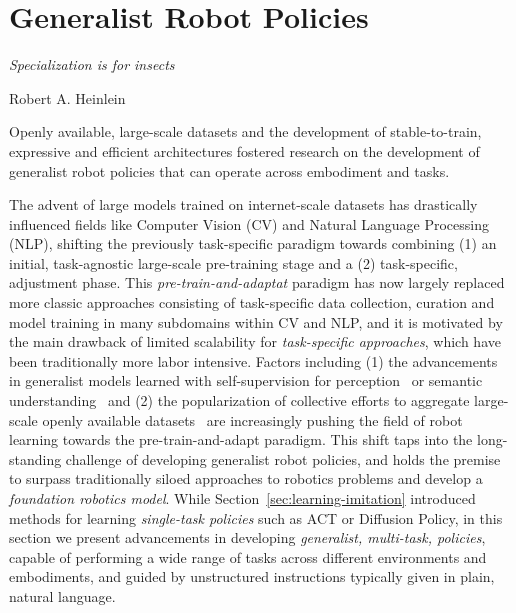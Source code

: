 \section{Generalist Robot Policies}
\label{sec:learning-foundation}

\epigraph{\textit{Specialization is for insects}}{Robert A. Heinlein}

\begin{tldr}
Openly available, large-scale datasets and the development of stable-to-train, expressive and efficient architectures fostered research on the development of generalist robot policies that can operate across embodiment and tasks.
\end{tldr}

The advent of large models trained on internet-scale datasets has drastically influenced fields like Computer Vision (CV) and Natural Language Processing (NLP), shifting the previously task-specific paradigm towards combining (1) an initial, task-agnostic large-scale pre-training stage and a (2) task-specific, adjustment phase.
This \emph{pre-train-and-adaptat} paradigm has now largely replaced more classic approaches consisting of task-specific data collection, curation and model training in many subdomains within CV and NLP, and it is motivated by the main drawback of limited scalability for \emph{task-specific approaches}, which have been traditionally more labor intensive.
Factors including (1) the advancements in generalist models learned with self-supervision for perception~\citep{oquabDINOv2LearningRobust2024} or semantic understanding~\citep{devlinBERTPretrainingDeep2019} and (2) the popularization of collective efforts to aggregate large-scale openly available datasets~\citep{oneillOpenXEmbodimentRobotic2025,khazatskyDROIDLargeScaleInTheWild2025} are increasingly pushing the field of robot learning towards the pre-train-and-adapt paradigm.
This shift taps into the long-standing challenge of developing generalist robot policies, and holds the premise to surpass traditionally siloed approaches to robotics problems and develop a \emph{foundation robotics model}.
While Section~\ref{sec:learning-imitation} introduced methods for learning \emph{single-task policies} such as ACT or Diffusion Policy, in this section we present advancements in developing \emph{generalist, multi-task, policies}, capable of performing a wide range of tasks across different environments and embodiments, and guided by unstructured instructions typically given in plain, natural language.

